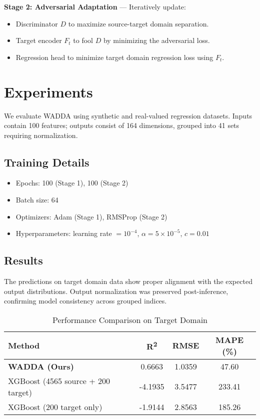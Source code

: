\documentclass{article}
\begin{document}
\textbf{Stage 2: Adversarial Adaptation} — Iteratively update:
\begin{itemize}
  \item Discriminator $D$ to maximize source-target domain separation.
  \item Target encoder $F_t$ to fool $D$ by minimizing the adversarial loss.
  \item Regression head to minimize target domain regression loss using $F_t$.
\end{itemize}

\section{Experiments}
We evaluate WADDA using synthetic and real-valued regression datasets. Inputs contain 100 features; outputs consist of 164 dimensions, grouped into 41 sets requiring normalization.

\subsection{Training Details}
\begin{itemize}
  \item Epochs: 100 (Stage 1), 100 (Stage 2)
  \item Batch size: 64
  \item Optimizers: Adam (Stage 1), RMSProp (Stage 2)
  \item Hyperparameters: learning rate $=10^{-4}$, $\alpha=5 \times 10^{-5}$, $c=0.01$
\end{itemize}

\subsection{Results}
The predictions on target domain data show proper alignment with the expected output distributions. Output normalization was preserved post-inference, confirming model consistency across grouped indices.

\begin{table}[h]
\centering
\caption{Performance Comparison on Target Domain}
\begin{tabular}{|l|c|c|c|}
\hline
\textbf{Method} & \textbf{R\textsuperscript{2}} & \textbf{RMSE} & \textbf{MAPE (\%)} \\
\hline
\textbf{WADDA (Ours)} & 0.6663 & 1.0359 & 47.60 \\
XGBoost (4565 source + 200 target) & -4.1935 & 3.5477 & 233.41 \\
XGBoost (200 target only) & -1.9144 & 2.8563 & 185.26 \\
\hline
\end{tabular}
\label{tab:performance}
\end{table}
\end{document}
